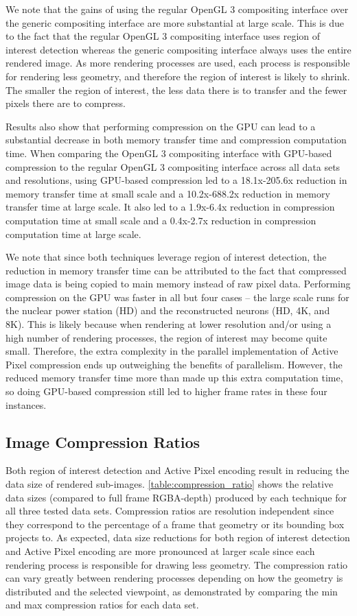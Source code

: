 \documentclass{vgtc}                          %
\begin{document}
We note that the gains of using the regular OpenGL 3 compositing interface over the generic compositing interface are more substantial at large scale. This is due to the fact that the regular OpenGL 3 compositing interface uses region of interest detection whereas the generic compositing interface always uses the entire rendered image. As more rendering processes are used, each process is responsible for rendering less geometry, and therefore the region of interest is likely to shrink. The smaller the region of interest, the less data there is to transfer and the fewer pixels there are to compress.

Results also show that performing compression on the GPU can lead to a substantial decrease in both memory transfer time and compression computation time. When comparing the OpenGL 3 compositing interface with GPU-based compression to the regular OpenGL 3 compositing interface across all data sets and resolutions, using GPU-based compression led to a 18.1x-205.6x reduction in memory transfer time at small scale and a 10.2x-688.2x reduction in memory transfer time at large scale. It also led to a 1.9x-6.4x reduction in compression computation time at small scale and a 0.4x-2.7x reduction in compression computation time at large scale.

We note that since both techniques leverage region of interest detection, the reduction in memory transfer time can be attributed to the fact that compressed image data is being copied to main memory instead of raw pixel data. Performing compression on the GPU was faster in all but four cases -- the large scale runs for the nuclear power station (HD) and the reconstructed neurons (HD, 4K, and 8K). This is likely because when rendering at lower resolution and/or using a high number of rendering processes, the region of interest may become quite small. Therefore, the extra complexity in the parallel implementation of Active Pixel compression ends up outweighing the benefits of parallelism. However, the reduced memory transfer time more than made up this extra computation time, so doing GPU-based compression still led to higher frame rates in these four instances.

\subsection{Image Compression Ratios}
Both region of interest detection and Active Pixel encoding result in reducing the data size of rendered sub-images. \autoref{table:compression_ratio} shows the relative data sizes (compared to full frame RGBA-depth) produced by each technique for all three tested data sets. Compression ratios are resolution independent since they correspond to the percentage of a frame that geometry or its bounding box projects to. As expected, data size reductions for both region of interest detection and Active Pixel encoding are more pronounced at larger scale since each rendering process is responsible for drawing less geometry. The compression ratio can vary greatly between rendering processes depending on how the geometry is distributed and the selected viewpoint, as demonstrated by comparing the min and max compression ratios for each data set.
\end{document}
